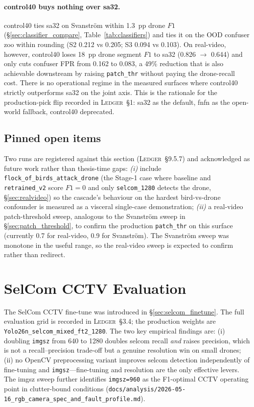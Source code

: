 \documentclass[12pt,a4paper,oneside,openright]{book}
\begin{document}
\paragraph{control40 buys nothing over sa32.}
control40 ties sa32 on Svanstr\"om within 1.3~pp drone $F1$ (\S\ref{sec:classifier_compare}, Table~\ref{tab:classifiers}) and ties it on the OOD confuser zoo within rounding (S2 0.212 vs 0.205; S3 0.094 vs 0.103). On real-video, however, control40 loses 18~pp drone segment $F1$ to sa32 (0.826 $\to$ 0.644) and only cuts confuser FPR from 0.162 to 0.083, a 49\% reduction that is also achievable downstream by raising \texttt{patch\_thr} without paying the drone-recall cost. There is no operational regime in the measured surfaces where control40 strictly outperforms sa32 on the joint axis. This is the rationale for the production-pick flip recorded in \textsc{Ledger}~\S1: sa32 as the default, fnfn as the open-world fallback, control40 deprecated.

\subsection{Pinned open items}
Two runs are registered against this section (\textsc{Ledger}~\S9.5.7) and acknowledged as future work rather than thesis-time gaps:
\emph{(i)} include \texttt{flock\_of\_birds\_attack\_drone} (the Stage-1 case where baseline and \texttt{retrained\_v2} score $F1=0$ and only \texttt{selcom\_1280} detects the drone, \S\ref{sec:realvideo}) so the cascade's behaviour on the hardest bird-vs-drone confounder is measured as a visceral single-case demonstration; \emph{(ii)} a real-video patch-threshold sweep, analogous to the Svanstr\"om sweep in \S\ref{sec:patch_threshold}, to confirm the production \texttt{patch\_thr} on this surface (currently 0.7 for real-video, 0.9 for Svanstr\"om). The Svanstr\"om sweep was monotone in the useful range, so the real-video sweep is expected to confirm rather than redirect.

\section{SelCom CCTV Evaluation}
\label{sec:selcom}

The SelCom CCTV fine-tune was introduced in \S\ref{sec:selcom_finetune}. The full evaluation grid is recorded in \textsc{Ledger}~\S3.4; the production weights are \texttt{Yolo26n\_selcom\_mixed\_ft2\_1280}. The two key empirical findings are: (i) doubling \texttt{imgsz} from 640 to 1280 doubles selcom recall \emph{and} raises precision, which is not a recall--precision trade-off but a genuine resolution win on small drones; (ii) no OpenCV preprocessing variant improves selcom detection independently of fine-tuning and \texttt{imgsz}---fine-tuning and resolution are the only effective levers. The imgsz sweep further identifies \texttt{imgsz=960} as the F1-optimal CCTV operating point in clutter-bound conditions (\texttt{docs/analysis/2026-05-16\_rgb\_camera\_spec\_and\_fault\_profile.md}).
\end{document}
